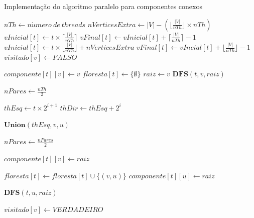 \documentclass[12pt]{article}
\begin{document}
{\color{gray}\lipsum[1]}

\begin{algorithm}
    \DontPrintSemicolon
    \caption{Implementação do algoritmo paralelo para componentes conexos}
    {
        $nTh \gets n\acute{u}mero\ de\ threads$\;
        $nVerticesExtra \gets |V| - (\lfloor \frac{|V|}{nTh} \rfloor \times nTh)$\;
        {
            {
                $vInicial[t] \gets t \times \lceil \frac{|V|}{nTh} \rceil$\;
                $vFinal[t] \gets vInicial[t] + \lceil \frac{|V|}{nTh} \rceil - 1$\;
            }
           {
                $vInicial[t] \gets t \times \lfloor \frac{|V|}{nTh} \rfloor + nVerticesExtra$\;
                $vFinal[t] \gets vIncial[t] + \lfloor \frac{|V|}{nTh} \rfloor - 1$\;
            }
        }
        {
            $visitado[v] \gets FALSO$\;
        }
        {
        
            {
                $componente[t][v] \gets v$\;
            }
            $floresta[t] \gets \{\emptyset\}$\;
            {
                {
                    $raiz \gets v$\;
                    $\textbf{DFS}(t,v,raiz)$\;
                }
            }
        }
        $nPares \gets \frac{nTh}{2}$\;
        {
            {
                $thEsq \gets t \times 2^{i+1}$\;
                $thDir \gets thEsq + 2^i$\;
                
                {
                    $\textbf{Union}(thEsq,v,u)$\;
                }
            }
            $nPares \gets \frac{nPares}{2}$\;
        }
    }
    {
        $componente[t][v] \gets raiz$\;
        
        {
            $floresta[t] \gets floresta[t] \cup \{(v,u)\}$\;
            $componente[t][u] \gets raiz$\;
            
            {
                {
                    $\textbf{DFS}(t,u,raiz)$\;
                }
            }
        }
        $visitado[v] \gets VERDADEIRO$\;
    }
\end{algorithm}
    
\end{document}
